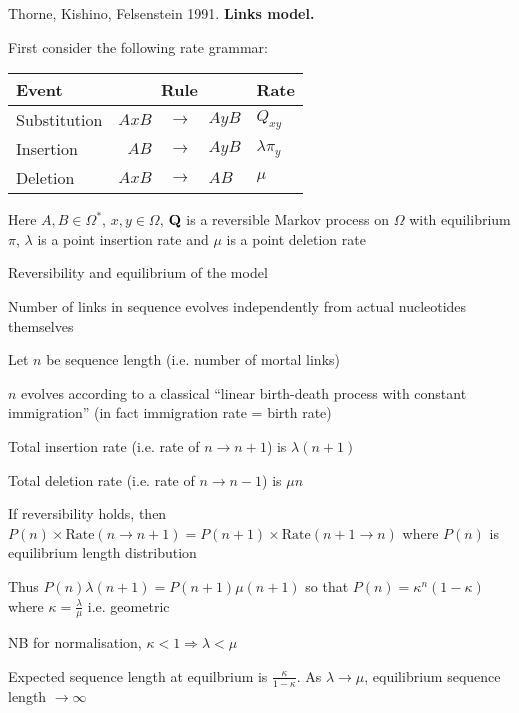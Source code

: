 \documentclass{beamer}
\begin{document}
\begin{frame}{}
\itemb
\item Thorne, Kishino, Felsenstein 1991. {\bf Links model.}
 \itemb
 \item First consider the following rate grammar: \\
\begin{tabular}{l|rll|l}
Event & \multicolumn{3}{c|}{Rule} & Rate \\
\hline
Substitution & $AxB$ & $\to$ & $AyB$ & $Q_{xy}$ \\
Insertion & $AB$ & $\to$ & $AyB$ & $\lambda \pi_y$ \\
Deletion & $AxB$ & $\to$ & $AB$ & $\mu$
\end{tabular}
 \item Here $A,B \in \Omega^\ast$, $x,y \in \Omega$, ${\bf Q}$ is a reversible Markov process on $\Omega$ with equilibrium $\pi$,
$\lambda$ is a point insertion rate and $\mu$ is a point deletion rate
 \iteme
\iteme
\end{frame}

\begin{frame}{}
\itemb
\item Reversibility and equilibrium of the model
 \itemb
 \item Number of links in sequence evolves independently from actual nucleotides themselves
 \item Let $n$ be sequence length (i.e. number of mortal links)
  \itemb
  \item $n$ evolves according to a classical ``linear birth-death process with constant immigration'' (in fact immigration rate = birth rate)
  \item Total insertion rate (i.e. rate of $n \to n+1$) is $\lambda (n+1)$
  \item Total deletion rate (i.e. rate of $n \to n-1$) is $\mu n$
  \item If reversibility holds, then $P(n) \times \mbox{Rate}(n \to n+1) = P(n+1) \times \mbox{Rate}(n+1 \to n)$ where $P(n)$ is equilibrium length distribution
  \item Thus $P(n) \lambda(n+1) = P(n+1) \mu(n+1)$ so that $P(n) = \kappa^n (1-\kappa)$ where $\kappa = \frac{\lambda}{\mu}$ i.e. geometric
  \item NB for normalisation, $\kappa < 1 \Rightarrow \lambda < \mu$
  \item Expected sequence length at equilbrium is $\frac{\kappa}{1-\kappa}$. As $\lambda \to \mu$, equilibrium sequence length $\to \infty$
  \iteme
 \iteme
\iteme
\end{frame}
\end{document}
